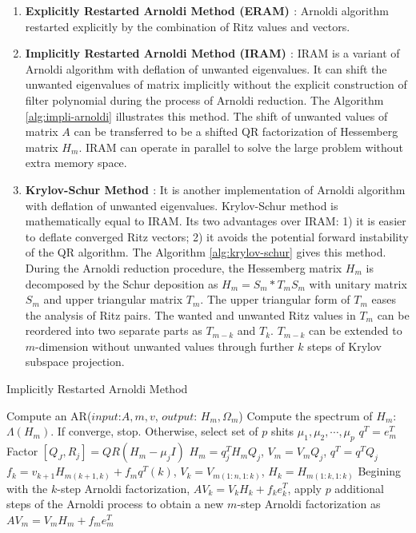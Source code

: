\begin{enumerate}
	\item \textbf{Explicitly Restarted Arnoldi Method (ERAM) \cite{morgan1996restarting}}: Arnoldi algorithm restarted explicitly by the combination of Ritz values and vectors.
	
	\item \textbf{Implicitly Restarted Arnoldi Method (IRAM) \cite{sorensen1997implicitly}}: IRAM is a variant of Arnoldi algorithm with deflation of unwanted eigenvalues. It can shift the unwanted eigenvalues of matrix implicitly without the explicit construction of filter polynomial during the process of Arnoldi reduction. The Algorithm \ref{alg:impli-arnoldi} illustrates this method. The shift of unwanted values of matrix $A$ can be transferred to be a shifted QR factorization of Hessemberg matrix $H_m$. IRAM can operate in parallel to solve the large problem without extra memory space.
	
	\item \textbf{Krylov-Schur Method \cite{stewart2002krylov}}: It is another implementation of Arnoldi algorithm with deflation of unwanted eigenvalues. Krylov-Schur method is mathematically equal to IRAM. Its two advantages over IRAM: 1) it is easier to deflate converged Ritz vectors; 2) it avoids the potential forward instability of the QR algorithm. The Algorithm \ref{alg:krylov-schur} gives this method. During the Arnoldi reduction procedure, the Hessemberg matrix $H_m$ is decomposed by the Schur deposition as $H_m=S_m*T_mS_m$ with unitary matrix $S_m$ and upper triangular matrix $T_m$. The upper triangular form of $T_m$ eases the analysis of Ritz pairs. The wanted and unwanted Ritz values in $T_m$ can be reordered into two separate parts as $T_{m-k}$ and $T_k$. $T_{m-k}$ can be extended to $m$-dimension without unwanted values through further $k$ steps of Krylov subspace projection. 
	
\end{enumerate}

\begin{algorithm}[t]{}
	\caption{Implicitly Restarted Arnoldi Method}   
	\label{alg:impli-arnoldi}   
	\begin{algorithmic}[1]
		\State Compute an AR($input$:$A,m,v$, $output$: $H_m, \Omega_m$)
		\State Compute the spectrum of $H_m$: $\Lambda (H_m)$. If converge, stop. Otherwise, select set of $p$ shits $\mu_1, \mu_2,\cdots, \mu_p$
		\State $q^T = e_m^T$
		\State Factor $[Q_J, R_j] = QR(H_m-\mu_jI)$
		\State $H_m = q_j^TH_mQ_j$, $V_m=V_mQ_j$, $q^T=q^TQ_j$
		\EndFor 
		\State $f_k=v_{k+1}H_{m(k+1,k)}+f_mq^T(k)$, $V_k=V_{m(1:n,1:k)}$, $H_k=H_{m(1:k,1:k)}$
		\State Begining with the $k$-step Arnoldi factorization, $AV_k=V_kH_k+f_ke_k^T$, apply $p$ additional steps of the Arnoldi process to obtain a new $m$-step Arnoldi factorization as $AV_m=V_mH_m+f_me_m^T$
		\EndFunction
	\end{algorithmic}  
\end{algorithm}

